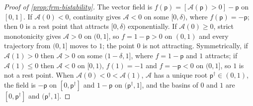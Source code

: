 \begin{proof}[Proof of \cref{prop:frm-bistability}]
The vector field is $f(\mathsf p)=[\mathcal A(\mathsf p)>0]-\mathsf p$ on $[0,1]$. If $\mathcal A(0)<0$, continuity gives $\mathcal A<0$ on some $[0,\delta)$, where $f(\mathsf p)=-\mathsf p$; then $0$ is a rest point that attracts $[0,\delta)$ exponentially. If $\mathcal A(0)\ge0$, strict monotonicity gives $\mathcal A>0$ on $(0,1]$, so $f=1-\mathsf p>0$ on $(0,1)$ and every trajectory from $(0,1]$ moves to $1$; the point $0$ is not attracting. Symmetrically, if $\mathcal A(1)>0$ then $\mathcal A>0$ on some $(1-\delta,1]$, where $f=1-\mathsf p$ and $1$ attracts; if $\mathcal A(1)\le0$ then $\mathcal A<0$ on $[0,1)$, $f(1)=-1$ and $f=-\mathsf p<0$ on $(0,1]$, so $1$ is not a rest point. When $\mathcal A(0)<0<\mathcal A(1)$, $\mathcal A$ has a unique root $\mathsf p^\dagger\in(0,1)$, the field is $-\mathsf p$ on $[0,\mathsf p^\dagger]$ and $1-\mathsf p$ on $(\mathsf p^\dagger,1]$, and the basins of $0$ and $1$ are $[0,\mathsf p^\dagger]$ and $(\mathsf p^\dagger,1]$.
\end{proof}

